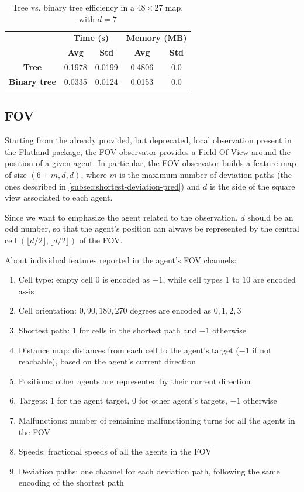 \documentclass[a4paper,10pt]{report}
\begin{document}
\begin{table}[h]
	\center
	\begin{tabular}{||c c c c c||}
		\hline
					& \multicolumn{2}{c}{\textbf{Time (s)}} & \multicolumn{2}{c||}{\textbf{Memory (MB)}} \\  [0.5ex]
					& \textbf{Avg}         & \textbf{Std}        & \textbf{Avg}          & \textbf{Std} \\  [0.5ex]
		\hline\hline
		\textbf{Tree} & 0.1978 & 0.0199 & 0.4806 & 0.0 \\
		\hline
		\textbf{Binary tree} & 0.0335 & 0.0124 & 0.0153 & 0.0 \\
		\hline       
	\end{tabular}
	\caption{Tree vs. binary tree efficiency in a $48\times 27$ map, with $d=7$}
	\label{table:tree-bt-48x27}
\end{table}

\subsection{FOV}\label{subsec:fov-obs}
Starting from the already provided, but deprecated, local observation present in the Flatland package, the FOV observator provides a Field Of View around the position of a given agent. In particular, the FOV observator builds a feature map of size $(6 + m, d, d)$, where $m$ is the maximum number of deviation paths (the ones described in \ref{subsec:shortest-deviation-pred}) and $d$ is the side of the square view associated to each agent.

Since we want to emphasize the agent related to the observation, $d$ should be an odd number, so that the agent's position can always be represented by the central cell $(\lfloor d / 2 \rfloor, \lfloor d / 2 \rfloor)$ of the FOV.

About individual features reported in the agent's FOV channels:
\begin{enumerate}
	\item Cell type: empty cell $0$ is encoded as $-1$, while cell types $1$ to $10$ are encoded as-is
	\item Cell orientation: $0, 90, 180, 270$ degrees are encoded as $0, 1, 2, 3$
	\item Shortest path: $1$ for cells in the shortest path and $-1$ otherwise
	\item Distance map: distances from each cell to the agent's target ($-1$ if not reachable), based on the agent's current direction 
	\item Positions: other agents are represented by their current direction
	\item Targets: $1$ for the agent target, $0$ for other agent's targets, $-1$ otherwise
	\item Malfunctions: number of remaining malfunctioning turns for all the agents in the FOV
	\item Speeds: fractional speeds of all the agents in the FOV
	\item Deviation paths: one channel for each deviation path, following the same encoding of the shortest path
\end{enumerate}
\end{document}
